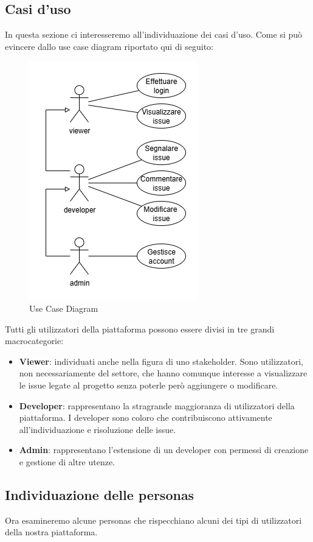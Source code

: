 \documentclass[a4paper, 11pt]{article}
\begin{document}
\subsection{Casi d'uso}
In questa sezione ci interesseremo all'individuazione dei casi d'uso. Come si può evincere dallo use case diagram riportato qui di seguito:

\begin{figure}[H]
    \centering
    \includegraphics[width=0.5\linewidth]{UseCase_Diagram}
    \caption{Use Case Diagram}
    \label{fig:use_case_diagram}
\end{figure}

Tutti gli utilizzatori della piattaforma possono essere divisi in tre grandi macrocategorie:
\begin{itemize}
    \item \textbf{Viewer}: individuati anche nella figura di uno stakeholder. Sono utilizzatori, non necessariamente del settore, che hanno comunque interesse a visualizzare le issue legate al progetto senza poterle però aggiungere o modificare.
    \item \textbf{Developer}: rappresentano la stragrande maggioranza di utilizzatori della piattaforma. I developer sono coloro che contribuiscono attivamente all'individuazione e risoluzione delle issue.
    \item \textbf{Admin}: rappresentano l'estensione di un developer con permessi di creazione e gestione di altre utenze.
\end{itemize}

\newpage
\subsection{Individuazione delle personas}
Ora esamineremo alcune personas che rispecchiano alcuni dei tipi di utilizzatori della nostra piattaforma.
\end{document}
